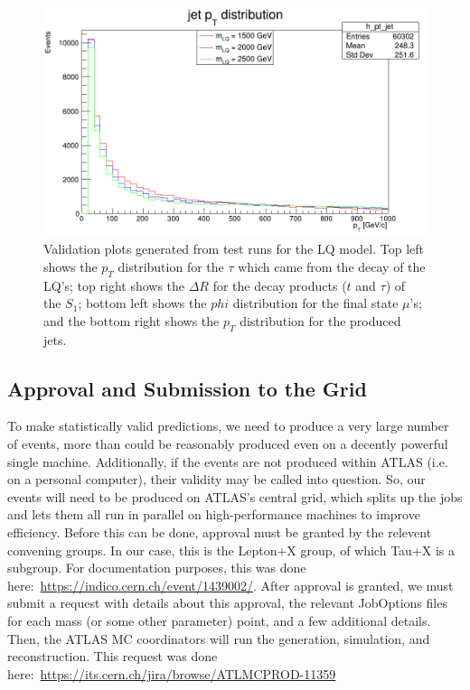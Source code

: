 \begin{figure}[ht]
            \includegraphics[scale=0.2]{res/ValidationPlots/h_pt_jet.png}

            \caption{Validation plots generated from test runs for the LQ model. Top left shows the $p_T$ distribution for the $\tau$ which came from the decay of the LQ's; top right shows the $\Delta R$ for the decay products ($t$ and $\tau$) of the $S_1$; bottom left shows the $phi$ distribution for the final state $\mu$'s; and the bottom right shows the $p_T$ distribution for the produced jets.}
            \label{validationPlots}
        \end{figure}

    \subsection{Approval and Submission to the Grid}
        To make statistically valid predictions, we need to produce a very large number of events, more than could be reasonably produced even on a decently powerful single machine. Additionally, if the events are not produced within ATLAS (i.e. on a personal computer), their validity may be called into question. So, our events will need to be produced on ATLAS's central grid, which splits up the jobs and lets them all run in parallel on high-performance machines to improve efficiency. Before this can be done, approval must be granted by the relevent convening groups. In our case, this is the Lepton+X group, of which Tau+X is a subgroup. For documentation purposes, this was done here:~\url{https://indico.cern.ch/event/1439002/}. After approval is granted, we must submit a request with details about this approval, the relevant JobOptions files for each mass (or some other parameter) point, and a few additional details. Then, the ATLAS MC coordinators will run the generation, simulation, and reconstruction. This request was done here:~\url{https://its.cern.ch/jira/browse/ATLMCPROD-11359}

        
